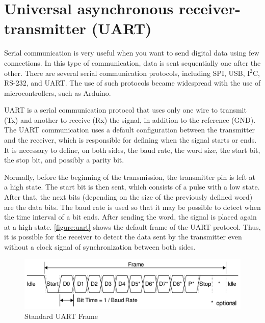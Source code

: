         
    
    \section{Universal asynchronous receiver-transmitter (UART)}\label{sec:section_p.4}


        Serial communication is very useful when you want to send digital data using few connections. In this type of communication, data is sent sequentially one after the other. There are several serial communication protocols, including SPI, USB, I$^2$C, RS-232, and UART. The use of such protocols became widespread with the use of microcontrollers, such as Arduino.
        
        UART is a serial communication protocol that uses only one wire to transmit (Tx) and another to receive (Rx) the signal, in addition to the reference (GND). The UART communication uses a default configuration between the transmitter and the receiver, which is responsible for defining when the signal starts or ends. It is necessary to define, on both sides, the baud rate, the word size, the start bit, the stop bit, and possibly a parity bit.
        
        Normally, before the beginning of the transmission, the transmitter pin is left at a high state. The start bit is then sent, which consists of a pulse with a low state. After that, the next bits (depending on the size of the previously defined word) are the data bits. The baud rate is used so that it may be possible to detect when the time interval of a bit ends. After sending the word, the signal is placed again at a high state. \autoref{figure:uart} shows the default frame of the UART protocol. Thus, it is possible for the receiver to detect the data sent by the transmitter even without a clock signal of synchronization between both sides.
        
        \begin{figure}[!ht]
            \begin{center}
                \includegraphics[width= \textwidth]{figures/UART.png}
                \caption{\label{figure:uart} Standard UART Frame}
            \end{center}
        \end{figure}

